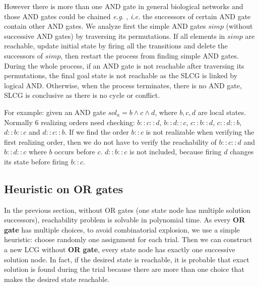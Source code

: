\documentclass[runningheads]{llncs}
\begin{document}
However there is more than one AND gate in general biological networks and those AND gates could be chained \textit{e.g.} \cite{samaga2009logic}, \textit{i.e.} the successors of certain AND gate contain other AND gates.
We analyze first the simple AND gates $simp$ (without successive AND gates) by traversing its permutations.
If all elements in $simp$ are reachable, update initial state by firing all the transitions and delete the successors of $simp$, then restart the process from finding simple AND gates.
During the whole process, if an AND gate is not reachable after traversing its permutations, the final goal state is not reachable as the SLCG is linked by logical AND. 
Otherwise, when the process terminates, there is no AND gate, SLCG is conclusive as there is no cycle or conflict.


For example: given an AND gate $sol_a=b\land c\land d$, where $b,c,d$ are local states.
Normally 6 realizing orders need checking: $b::c::d$, $b::d::c$, $c::b::d$, $c::d::b$, $d::b::c$ and $d::c::b$. 
If we find the order $b::c$ is not realizable when verifying the first realizing order, then we do not have to verify the reachability of $b::c::d$ and $b::d::c$ where $b$ occurs before $c$. $d::b::c$ is not included, because firing $d$ changes its state before firing $b::c$.


\subsection{Heuristic on OR gates}\label{sec:OR}
In the previous section, without OR gates (one state node has multiple solution successors), reachability problem is solvable in polynomial time.
As every \textbf{OR gate} has multiple choices, to avoid combinatorial explosion, we use a simple heuristic: 
choose randomly one assignment for each trial.
Then we can construct a new LCG without \textbf{OR gate}, every state node has exactly one successive solution node.
In fact, if the desired state is reachable, it is probable that exact solution is found during the trial because there are more than one choice that makes the desired state reachable.
\end{document}
